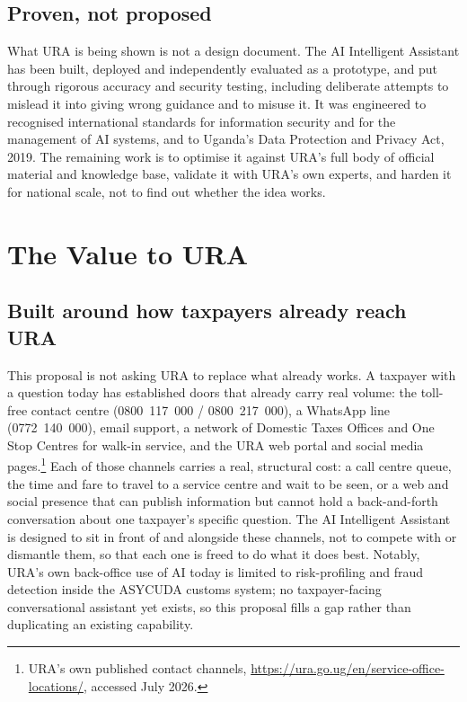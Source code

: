 \documentclass[11pt,a4paper]{article}
\begin{document}
\subsection*{Proven, not proposed}

What URA is being shown is not a design document. The AI Intelligent Assistant has been built, deployed and independently evaluated as a prototype, and put through rigorous accuracy and security testing, including deliberate attempts to mislead it into giving wrong guidance and to misuse it. It was engineered to recognised international standards for information security and for the management of AI systems, and to Uganda's Data Protection and Privacy Act, 2019. The remaining work is to optimise it against URA's full body of official material and knowledge base, validate it with URA's own experts, and harden it for national scale, not to find out whether the idea works.

\section{The Value to URA}

\subsection*{Built around how taxpayers already reach URA}

This proposal is not asking URA to replace what already works. A taxpayer with a question today has established doors that already carry real volume: the toll-free contact centre (0800~117~000 / 0800~217~000), a WhatsApp line (0772~140~000), email support, a network of Domestic Taxes Offices and One Stop Centres for walk-in service, and the URA web portal and social media pages.\footnote{URA's own published contact channels, \url{https://ura.go.ug/en/service-office-locations/}, accessed July 2026.} Each of those channels carries a real, structural cost: a call centre queue, the time and fare to travel to a service centre and wait to be seen, or a web and social presence that can publish information but cannot hold a back-and-forth conversation about one taxpayer's specific question. The AI Intelligent Assistant is designed to sit in front of and alongside these channels, not to compete with or dismantle them, so that each one is freed to do what it does best. Notably, URA's own back-office use of AI today is limited to risk-profiling and fraud detection inside the ASYCUDA customs system; no taxpayer-facing conversational assistant yet exists, so this proposal fills a gap rather than duplicating an existing capability.
\end{document}
